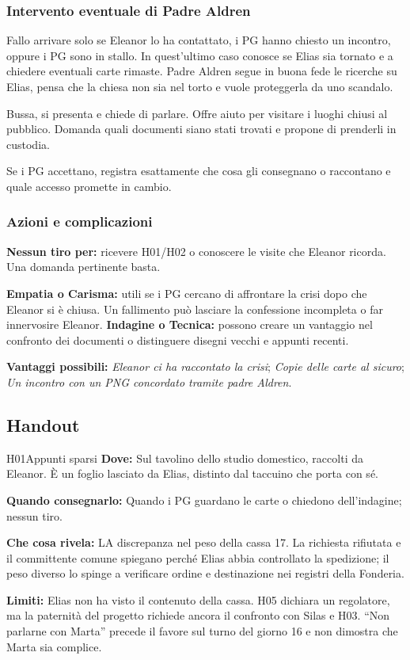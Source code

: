 \documentclass[11pt,a4paper]{article}
\newcommand{\aspect}[1]{\textit{\textcolor{blood}{#1}}}
\begin{document}
\subsubsection{Intervento eventuale di Padre Aldren}
Fallo arrivare solo se Eleanor lo ha contattato, i PG hanno chiesto un incontro, oppure i PG sono in stallo. In quest'ultimo caso conosce se Elias sia tornato e a chiedere eventuali carte rimaste. Padre Aldren segue in buona fede le ricerche su Elias, pensa che la chiesa non sia nel torto e vuole proteggerla da uno scandalo.

Bussa, si presenta e chiede di parlare. Offre aiuto per visitare i luoghi chiusi al pubblico. Domanda quali documenti siano stati trovati e propone di prenderli in custodia.

Se i PG accettano, registra esattamente che cosa gli consegnano o raccontano e quale accesso promette in cambio.

\subsubsection{Azioni e complicazioni}
\begin{fatebox}
\textbf{Nessun tiro per:} ricevere H01/H02 o conoscere le visite che Eleanor ricorda. Una domanda pertinente basta.

\textbf{Empatia o Carisma:} utili se i PG cercano di affrontare la crisi dopo che Eleanor si è chiusa. Un fallimento può lasciare la confessione incompleta o far innervosire Eleanor.
\textbf{Indagine o Tecnica:} possono creare un vantaggio nel confronto dei documenti o distinguere disegni vecchi e appunti recenti.

\textbf{Vantaggi possibili:} \aspect{Eleanor ci ha raccontato la crisi}; \aspect{Copie delle carte al sicuro}; \aspect{Un incontro con un PNG concordato tramite padre Aldren}.

\end{fatebox}

\subsection{Handout}
\label{nodo-0-handout}
{}
\begin{handoutbox}{H01}{Appunti sparsi}
\textbf{Dove:} Sul tavolino dello studio domestico, raccolti da Eleanor. È un foglio lasciato da Elias, distinto dal taccuino che porta con sé.

\textbf{Quando consegnarlo:} Quando i PG guardano le carte o chiedono dell'indagine; nessun tiro.

\textbf{Che cosa rivela:} LA discrepanza nel peso della cassa 17. La richiesta rifiutata e il committente comune spiegano perché Elias abbia controllato la spedizione; il peso diverso lo spinge a verificare ordine e destinazione nei registri della Fonderia.

\textbf{Limiti:} Elias non ha visto il contenuto della cassa. H05 dichiara un regolatore, ma la paternità del progetto richiede ancora il confronto con Silas e H03. ``Non parlarne con Marta'' precede il favore sul turno del giorno 16 e non dimostra che Marta sia complice.
\end{handoutbox}
\end{document}
